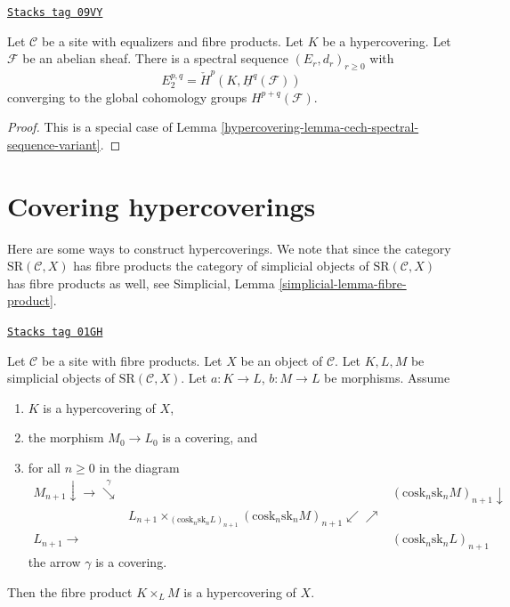 \begin{lemma}
\label{hypercovering-lemma-cech-spectral-sequence-verdier}
\href{https://stacks.math.columbia.edu/tag/09VY}{\texttt{Stacks tag 09VY}}

Let $\mathcal{C}$ be a site with equalizers and fibre products.
Let $K$ be a hypercovering.
Let $\mathcal{F}$ be an abelian sheaf. There is a
spectral sequence $(E_r, d_r)_{r \geq 0}$ with
$$
E_2^{p, q} = \check{H}^p(K, \underline{H}^q(\mathcal{F}))
$$
converging to the global cohomology groups $H^{p + q}(\mathcal{F})$.
\end{lemma}

\begin{proof}

This is a special case of Lemma \ref{hypercovering-lemma-cech-spectral-sequence-variant}.
\end{proof}

\section{Covering hypercoverings}
\label{hypercovering-section-covering}
Here are some ways to construct hypercoverings.
We note that since the category
$\text{SR}(\mathcal{C}, X)$ has fibre products
the category of simplicial objects
of $\text{SR}(\mathcal{C}, X)$ has fibre products
as well, see Simplicial, Lemma \ref{simplicial-lemma-fibre-product}.

\begin{lemma}
\label{hypercovering-lemma-funny-gamma}
\href{https://stacks.math.columbia.edu/tag/01GH}{\texttt{Stacks tag 01GH}}

Let $\mathcal{C}$ be a site with fibre products.
Let $X$ be an object of $\mathcal{C}$.
Let $K, L, M$ be simplicial objects of $\text{SR}(\mathcal{C}, X)$.
Let $a : K \to L$, $b : M \to L$ be morphisms.
Assume
\begin{enumerate}
\item $K$ is a hypercovering of $X$,
\item the morphism $M_0 \to L_0$ is a covering, and
\item for all $n \geq 0$ in the diagram
$$
\begin{array}{ccc}M_{n + 1} \downarrow\longrightarrow\overset{\gamma}{\searrow} &  & (\text{cosk}_n \text{sk}_n M)_{n + 1} \downarrow \\  & L_{n + 1}
\times_{(\text{cosk}_n \text{sk}_n L)_{n + 1}}
(\text{cosk}_n \text{sk}_n M)_{n + 1}
\swarrow\nearrow &  \\ L_{n + 1} \longrightarrow &  & (\text{cosk}_n \text{sk}_n L)_{n + 1}\end{array}
$$
the arrow $\gamma$ is a covering.
\end{enumerate}
Then the fibre product $K \times_L M$ is a hypercovering of $X$.
\end{lemma}

